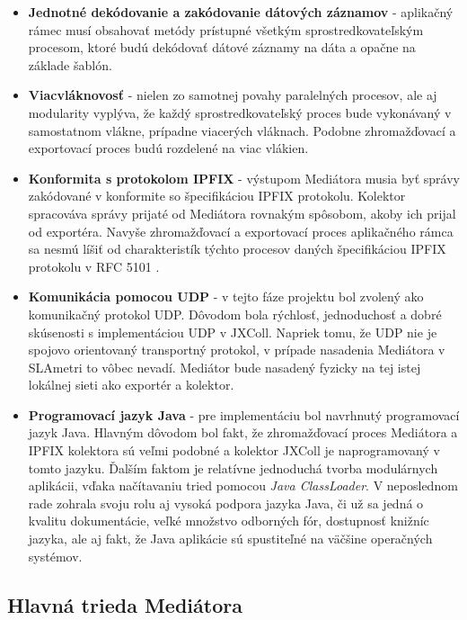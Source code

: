 \begin{itemize}
 \item \textbf{Jednotné dekódovanie a zakódovanie dátových záznamov} - aplikačný rámec musí obsahovať metódy 
 prístupné všetkým sprostredkovateľským procesom, ktoré budú dekódovať dátové záznamy na dáta a opačne
 na základe šablón.
 
 \item \textbf{Viacvláknovosť} - nielen zo samotnej povahy paralelných procesov, ale aj modularity vyplýva, 
 že každý sprostredkovateľský proces bude vykonávaný v samostatnom vlákne, prípadne viacerých vláknach. 
 Podobne zhromažďovací a exportovací proces budú rozdelené na viac vlákien. 
 
 \item \textbf{Konformita s protokolom IPFIX} - výstupom Mediátora musia byť správy zakódované 
 v konformite so špecifikáciou IPFIX protokolu. Kolektor spracováva správy prijaté od Mediátora rovnakým
 spôsobom, akoby ich prijal od exportéra. Navyše zhromažďovací a exportovací proces aplikačného rámca sa 
 nesmú líšiť od charakteristík týchto procesov daných špecifikáciou IPFIX protokolu v RFC 
 5101 \citep{rfc5101}.
 
 \item \textbf{Komunikácia pomocou UDP} - v tejto fáze projektu bol zvolený ako komunikačný protokol UDP.
 Dôvodom bola rýchlosť, jednoduchosť a dobré skúsenosti s implementáciou UDP v JXColl. Napriek tomu, že 
 UDP nie je  spojovo orientovaný transportný protokol, v prípade nasadenia Mediátora v SLAmetri to vôbec
 nevadí. Mediátor bude nasadený fyzicky na tej istej lokálnej sieti ako exportér a kolektor. 
 
 \item \textbf{Programovací jazyk Java} - pre implementáciu bol navrhnutý programovací jazyk Java.
 Hlavným dôvodom bol fakt, že zhromažďovací proces Mediátora a IPFIX kolektora sú veľmi podobné a kolektor 
 JXColl je naprogramovaný v tomto jazyku. Ďalším faktom je relatívne jednoduchá tvorba modulárnych aplikácii,
 vďaka načítavaniu tried pomocou \emph{Java ClassLoader}. V neposlednom rade zohrala svoju rolu aj vysoká
 podpora jazyka Java, či už sa jedná o kvalitu dokumentácie, veľké množstvo odborných fór, dostupnosť 
 knižníc jazyka, ale aj fakt, že Java aplikácie sú spustiteľné na väčšine operačných systémov.
\end{itemize}


\subsection{Hlavn\'a trieda Medi\'atora}


